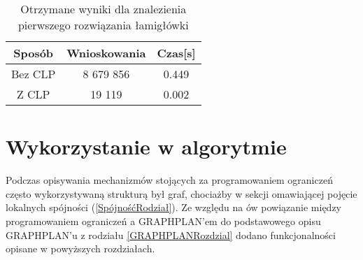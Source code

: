     \begin{table}[H]
        \centering
         \begin{tabular}{||c | c | c||} 
         \hline
         Sposób & Wnioskowania & Czas[s] \\ [0.5ex] 
         \hline\hline
         Bez CLP & 8 679 856 & 0.449 \\ 
         \hline
         Z CLP & 19 119 & 0.002  \\ [1ex]
         \hline
         \end{tabular}
         \caption{Otrzymane wyniki dla znalezienia pierwszego rozwiązania łamigłówki}
    \end{table}

\section{Wykorzystanie w algorytmie}

    Podczas opisywania mechanizmów stojących za programowaniem ograniczeń często wykorzystywaną strukturą był graf, chociażby w sekcji omawiającej 
    pojęcie lokalnych spójności (\ref{SpójnośćRodział}). Ze względu na ów powiązanie między programowaniem ograniczeń a GRAPHPLAN'em do podstawowego opisu GRAPHPLAN'u z rodziału 
    \ref{GRAPHPLANRozdzial} dodano funkcjonalności opisane w powyższych rozdziałach. 

